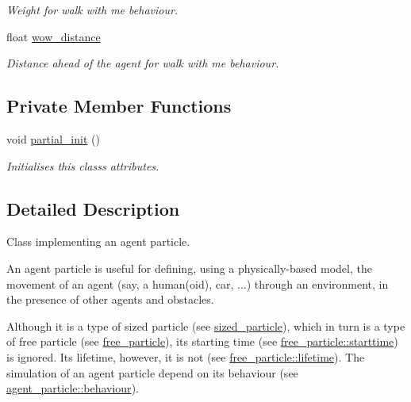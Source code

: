 \begin{DoxyCompactItemize}
\begin{DoxyCompactList}\small\item\em Weight for \textquotesingle{}walk with me\textquotesingle{} behaviour. \end{DoxyCompactList}\item 
\mbox{\label{classphysim_1_1particles_1_1agent__particle_aea89f1ac8529f17432d20280cff39411}} 
float \hyperlink{classphysim_1_1particles_1_1agent__particle_aea89f1ac8529f17432d20280cff39411}{wow\+\_\+distance}
\begin{DoxyCompactList}\small\item\em Distance ahead of the agent for \textquotesingle{}walk with me\textquotesingle{} behaviour. \end{DoxyCompactList}\end{DoxyCompactItemize}
\subsection*{Private Member Functions}
\begin{DoxyCompactItemize}
\item 
void \hyperlink{classphysim_1_1particles_1_1agent__particle_af48f594a16ab6c2ff3b475fa7f64266c}{partial\+\_\+init} ()
\begin{DoxyCompactList}\small\item\em Initialises this class\textquotesingle{}s attributes. \end{DoxyCompactList}\end{DoxyCompactItemize}


\subsection{Detailed Description}
Class implementing an agent particle. 

An agent particle is useful for defining, using a physically-\/based model, the movement of an agent (say, a human(oid), car, ...) through an environment, in the presence of other agents and obstacles.

Although it is a type of sized particle (see \hyperlink{classphysim_1_1particles_1_1sized__particle}{sized\+\_\+particle}), which in turn is a type of free particle (see \hyperlink{classphysim_1_1particles_1_1free__particle}{free\+\_\+particle}), its starting time (see \hyperlink{classphysim_1_1particles_1_1free__particle_ad0379ba926ecc909bfbfb373045bfcf9}{free\+\_\+particle\+::starttime}) is ignored. Its lifetime, however, it is not (see \hyperlink{classphysim_1_1particles_1_1free__particle_a5870d6fd3167d2c6120f887f45fe50fc}{free\+\_\+particle\+::lifetime}). The simulation of an agent particle depend on its behaviour (see \hyperlink{classphysim_1_1particles_1_1agent__particle_af219e3f46630bb7f51f3d00952ed4f1c}{agent\+\_\+particle\+::behaviour}). 

